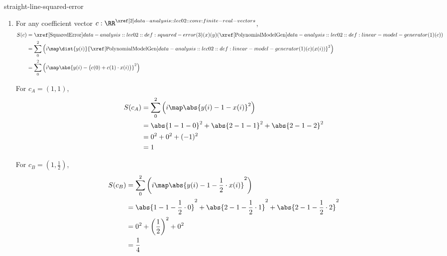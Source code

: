 \documentclass[12pt]{article}
\begin{document}
\begin{eg}{straight-line-squared-error}
\begin{enumerate}
      Notice that $x, y: \Fin(3) \to \RR$, so we know that
      $$S = \PolyError(3)(1)(x)(y): \RealVectors{2}\to\RR$$
      \item For any coefficient vector $c:\RealVectors{2}$,
      \begin{align*}
        S(c) &= \SquaredError(3)(x)(y)(\PolynomialModelGen(1)(c)) \\
        &= \sum_0^2\left(i\map
          \dist{y(i)}{\PolynomialModelGen(1)(c)(x(i))}^2\right) \\
        &= \sum_0^2\left(i\map
          \abs{y(i)-\bigl(c(0)+c(1)\cdot x(i)\bigr)}^2\right)
      \end{align*}

      For $c_A=(1,1)$,
      \begin{align*}
        S(c_A) &= \sum_0^2\left(i\map\abs{y(i)-1-x(i)}^2\right) \\
        &= \abs{1-1-0}^2+\abs{2-1-1}^2+\abs{2-1-2}^2 \\
        &= 0^2+0^2+(-1)^2 \\
        &= 1
      \end{align*}

      For $c_B=\left(1,\frac12\right)$,
      \begin{align*}
        S(c_B) &= \sum_0^2\left(i\map
          \abs{y(i)-1-\frac12\cdot x(i)}^2\right) \\
        &= \abs{1-1-\frac12\cdot0}^2
          +\abs{2-1-\frac12\cdot1}^2
          +\abs{2-1-\frac12\cdot2}^2 \\
        &= 0^2+\left(\frac12\right)^2+0^2 \\
        &= \frac14
      \end{align*}


\end{enumerate}
\end{eg}
\end{document}
